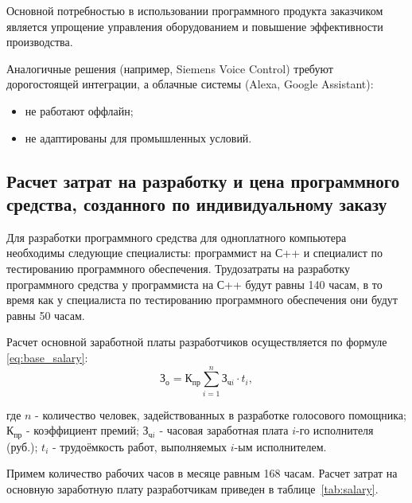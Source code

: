 Основной потребностью в использовании программного продукта заказчиком является упрощение управления оборудованием и повышение эффективности производства. 

Аналогичные решения (например, Siemens Voice Control) требуют дорогостоящей интеграции, а облачные системы (Alexa, Google Assistant):
\begin{itemize}
	\item не работают оффлайн;
	\item не адаптированы для промышленных условий.
\end{itemize}


\subsection{Расчет затрат на разработку и цена программного средства, созданного по индивидуальному заказу} 
\label{subsec:dev_cost_calculation}

Для разработки программного средства для одноплатного компьютера необходимы следующие специалисты: программист на С++ и специалист по тестированию программного обеспечения. Трудозатраты на разработку программного средства у программиста на С++ будут равны 140 часам, в то время как у специалиста по тестированию программного обеспечения они будут равны 50 часам.

Расчет основной заработной платы разработчиков осуществляется по формуле \ref{eq:base_salary}:
\begin{equation}
	\label{eq:base_salary}
	\mathrm{З_{о}} =  \mathrm{К_{пр}} \sum_{i=1}^n \text{З}_{\text{ч}i} \cdot t_i,
\end{equation}

где $n$ - количество человек, задействованных в разработке голосового помощника; 
$\mathrm{К_{пр}}$ - коэффициент премий; 
$\text{З}_{\text{ч}i}$ - часовая заработная плата $i$-го исполнителя (руб.); 
$t_i$ - трудоёмкость работ, выполняемых $i$-ым исполнителем.

Примем количество рабочих часов в месяце равным 168 часам. Расчет затрат на основную заработную плату разработчикам приведен в таблице~\ref{tab:salary}. 


